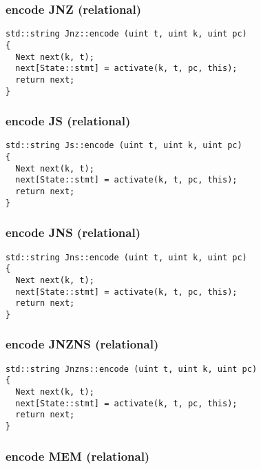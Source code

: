 \subsubsection{encode JNZ (relational)}

\begin{lstlisting}[style=c++]
std::string Jnz::encode (uint t, uint k, uint pc)
{
  Next next(k, t);
  next[State::stmt] = activate(k, t, pc, this);
  return next;
}
\end{lstlisting}

\subsubsection{encode JS (relational)}

\begin{lstlisting}[style=c++]
std::string Js::encode (uint t, uint k, uint pc)
{
  Next next(k, t);
  next[State::stmt] = activate(k, t, pc, this);
  return next;
}
\end{lstlisting}

\subsubsection{encode JNS (relational)}

\begin{lstlisting}[style=c++]
std::string Jns::encode (uint t, uint k, uint pc)
{
  Next next(k, t);
  next[State::stmt] = activate(k, t, pc, this);
  return next;
}
\end{lstlisting}

\subsubsection{encode JNZNS (relational)}

\begin{lstlisting}[style=c++]
std::string Jnzns::encode (uint t, uint k, uint pc)
{
  Next next(k, t);
  next[State::stmt] = activate(k, t, pc, this);
  return next;
}
\end{lstlisting}

\subsubsection{encode MEM (relational)}

